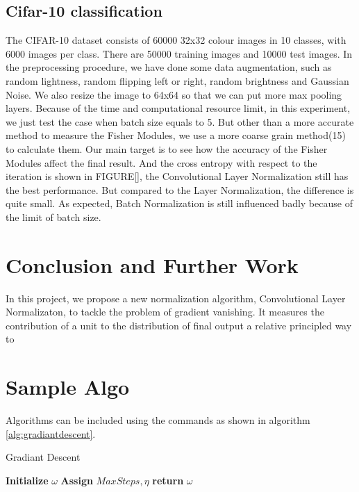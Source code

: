 \documentclass{sig-alternate}
\begin{document}
    \subsection{Cifar-10 classification}
    The CIFAR-10 dataset consists of 60000 32x32 colour images in 10 classes, with 6000 images per class. There are 50000 training images and 10000 test images.
    In the preprocessing procedure, we have done some data augmentation, such as random lightness, random flipping left or right, random brightness and Gaussian Noise. We also resize the image to 64x64 so that we can put more max pooling layers. Because of the time and computational resource limit, in this experiment, we just test the case when batch size equals to 5. But other than a more accurate method to measure the Fisher Modules, we use a more coarse grain method(15) to calculate them. Our main target is to see how the accuracy of the Fisher Modules affect the final result. And the cross entropy with respect to the iteration is shown in FIGURE[], the Convolutional Layer Normalization still has the best performance. But compared to the Layer Normalization, the difference is quite small. As expected, Batch Normalization is still influenced badly because of the limit of batch size. 

\section{Conclusion and Further Work}
    In this project, we propose a new normalization algorithm, Convolutional Layer Normalizaton, to tackle the problem of gradient vanishing. It measures the contribution of a unit to the distribution of final output a relative principled way to 

 

\section{Sample Algo}
Algorithms can be included using the commands as shown in algorithm \ref{alg:gradiantdescent}.

    \begin{algorithm}
        \caption{Gradiant Descent}\label{alg:gradiantdescent}
        \begin {algorithmic}[1]
            \STATE \textbf{Initialize} $\omega$
            \STATE \textbf{Assign} $MaxSteps, \eta$
            \ENDWHILE
            \STATE \textbf{return} $\omega$
        \end{algorithmic}
    \end{algorithm}
    
\end{document}
